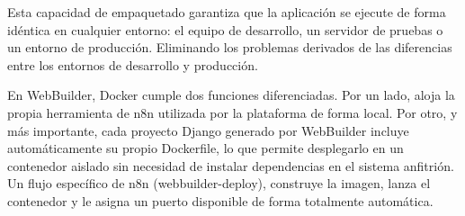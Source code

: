Esta capacidad de empaquetado garantiza que la aplicación se ejecute de forma idéntica en cualquier entorno: el equipo de desarrollo, un servidor de pruebas o un entorno de producción. Eliminando los problemas derivados de las diferencias entre los entornos de desarrollo y producción.

En WebBuilder, Docker cumple dos funciones diferenciadas. Por un lado, aloja la propia herramienta de n8n utilizada por la plataforma de forma local. Por otro, y más importante, cada proyecto Django generado por WebBuilder incluye automáticamente su propio Dockerfile, lo que permite desplegarlo en un contenedor aislado sin necesidad de instalar dependencias en el sistema anfitrión. Un flujo específico de n8n (webbuilder-deploy), construye la imagen, lanza el contenedor y le 
asigna un puerto disponible de forma totalmente automática.
